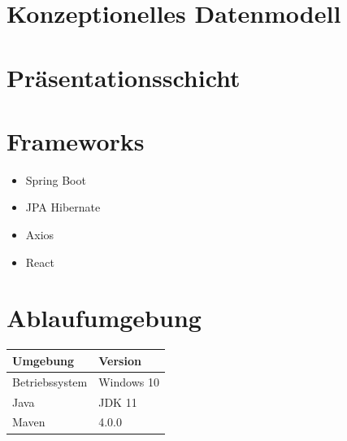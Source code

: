 \chapter{Konzeptionelles Datenmodell}
\clearpage
\chapter{Präsentationsschicht}
\clearpage
\chapter{Frameworks}
\begin{itemize}
    \item Spring Boot
    \item JPA Hibernate
    \item Axios
    \item React
\end{itemize}
\chapter{Ablaufumgebung}
\begin{table}[H]
    \begin{tabular}{p{}|p{}}
        Umgebung & Version \\
        \hline
        \hline
        Betriebssystem & Windows 10 \\
        Java & JDK 11 \\
        Maven & 4.0.0 \\
    \end{tabular}
\end{table}
\clearpage
